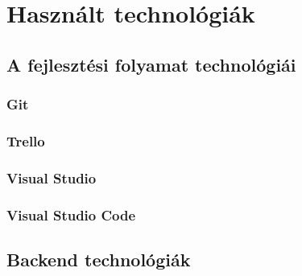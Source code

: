 \chapter{Használt technológiák}
\label{chapt:birdmap-technologies}

\section{A fejlesztési folyamat technológiái}
\subsection{Git}
\subsection{Trello}
\subsection{Visual Studio}
\subsection{Visual Studio Code}

\section{Backend technológiák}
